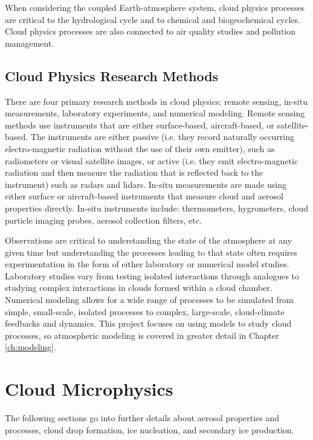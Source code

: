 When considering the coupled Earth-atmosphere system, cloud physics processes are critical to the hydrological cycle and to chemical and biogeochemical cycles. Cloud physics processes are also connected to air quality studies and pollution management.

\section{Cloud Physics Research Methods}
There are four primary research methods in cloud physics: remote sensing, in-situ measurements, laboratory experiments, and numerical modeling. Remote sensing methods use instruments that are either surface-based, aircraft-based, or satellite-based. The instruments are either passive (i.e. they record naturally occurring electro-magnetic radiation without the use of their own emitter), such as radiometers or visual satellite images, or active (i.e. they emit electro-magnetic radiation and then measure the radiation that is reflected back to the instrument) such as radars and lidars. In-situ measurements are made using either surface or aircraft-based instruments that measure cloud and aerosol properties directly. In-situ instruments include: thermometers, hygrometers, cloud particle imaging probes, aerosol collection filters, etc.

Observations are critical to understanding the state of the atmosphere at any given time but understanding the processes leading to that state often requires experimentation in the form of either laboratory or numerical model studies. Laboratory studies vary from testing isolated interactions through analogues to studying complex interactions in clouds formed within a cloud chamber. Numerical modeling allows for a wide range of processes to be simulated from simple, small-scale, isolated processes to complex, large-scale, cloud-climate feedbacks and dynamics. This project focuses on using models to study cloud processes, so atmospheric modeling is covered in greater detail in Chapter \ref{ch:modeling}.

\chapter{Cloud Microphysics}
The following sections go into further details about aerosol properties and processes, cloud drop formation, ice nucleation, and secondary ice production.

